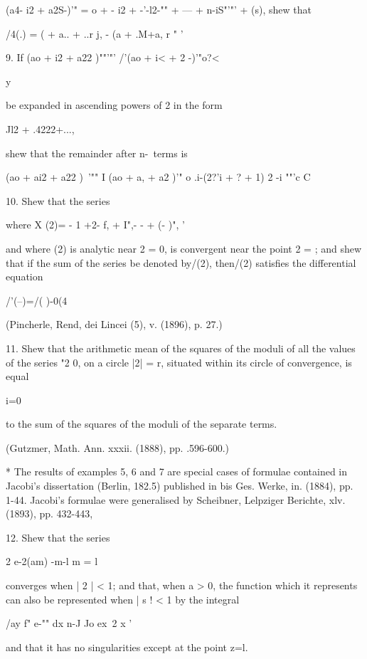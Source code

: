 {{{{(a4- i2 + a2S-)'" = o + - i2 + -'-l2-"" + --- + n-iS"'"' + (s), shew
that

/4(.) = ( + a.. + ..r j, - (a + .M+a, r " '

9. If (ao + i2 + a22 )""'"' /'(ao + i< + 2 -)'"o?<

y


be expanded in ascending powers of 2 in the form

Jl2 + .4222+...,

shew that the remainder after n-\ terms is

(ao + ai2 + a22 )~'"" I (ao + a, + a2 )'" o .i-(2?'i + ? + 1) 2 -i
""'c C


10. Shew that the series

where X (2)= - 1 +2- f, + I",- - + (- )", '

and where (2) is analytic near 2 = 0, is convergent near the point 2 =
; and shew that if the sum of the series be denoted by/(2), then/(2)
satisfies the differential equation

/'(--)=/( )-0(4

(Pincherle, Rend, dei Lincei (5), v. (1896), p. 27.)

11. Shew that the arithmetic mean of the squares of the moduli of all
the values of the series "2 0, on a circle |2| = r, situated within
its circle of convergence, is equal

 i=0

to the sum of the squares of the moduli of the separate terms.

(Gutzmer, Math. Ann. xxxii. (1888), pp. .596-600.)

* The results of examples 5, 6 and 7 are special cases of formulae
contained in Jacobi's dissertation (Berlin, 182.5) published in bis
Ges. Werke, in. (1884), pp. 1-44. Jacobi's formulae were generalised
by Scheibner, Lelpziger Berichte, xlv. (1893), pp. 432-443,

%
%

12. Shew that the series

2 e-2(am) -m-l m = l

converges when | 2 | < 1; and that, when a > 0, the function which it
represents can also be represented when | s ! < 1 by the integral

/ay f" e-"" dx n-J Jo ex\ 2 x '

and that it has no singularities except at the point z=l.

}}}}
